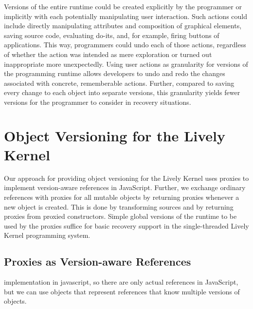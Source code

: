 Versions of the entire runtime could be created explicitly by the programmer or implicitly with each potentially manipulating user interaction.
Such actions could include directly manipulating attributes and composition of graphical elements, saving source code, evaluating do-its, and, for example, firing buttons of applications.
This way, programmers could undo each of those actions, regardless of whether the action was intended as mere exploration or turned out inappropriate more unexpectedly.
Using user actions as granularity for versions of the programming runtime allows developers to undo and redo the changes associated with concrete, rememberable actions.
Further, compared to saving every change to each object into separate versions, this granularity yields fewer versions for the programmer to consider in recovery situations.

\section{Object Versioning for the Lively Kernel}

Our approach for providing object versioning for the Lively Kernel uses proxies to implement version-aware references in JavaScript.
Further, we exchange ordinary references with proxies for all mutable objects by returning proxies whenever a new object is created.
This is done by transforming sources and by returning proxies from proxied constructors.
Simple global versions of the runtime to be used by the proxies suffice for basic recovery support in the single-threaded Lively Kernel programming system.

% 



\subsection{Proxies as Version-aware References}

implementation in javascript, so there are only actual references in JavaScript, but we can use objects that represent references that know multiple versions of objects.

